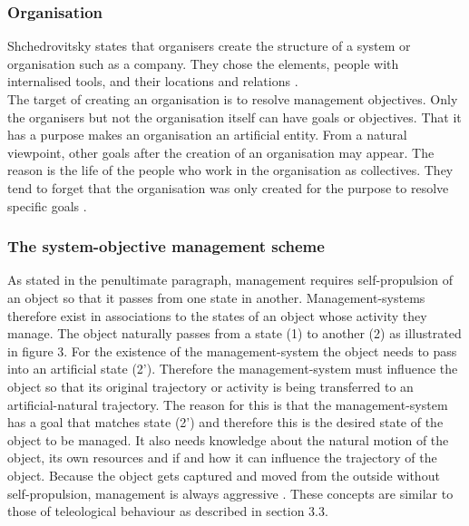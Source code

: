 \documentclass[11pt,a4paper]{article}
\begin{document}
\subsubsection{Organisation}
Shchedrovitsky states that organisers create the structure of a system or organisation such as a company. They chose the elements, people with internalised tools, and their locations and relations \cite[p. 51ff.]{MSM}.\\
The target of creating an organisation is to resolve management objectives. Only the organisers but not the organisation itself can have goals or objectives. That it has a purpose makes an organisation an artificial entity. From a natural viewpoint, other goals after the creation of an organisation may appear. The reason is the life of the people who work in the organisation as collectives. They tend to forget that the organisation was only created for the purpose to resolve specific goals \cite[p. 53f.]{MSM}. 

\subsubsection{The system-objective management scheme}
As stated in the penultimate paragraph, management requires self-propulsion of an object so that it passes from one state in another. Management-systems therefore exist in associations to the states of an object whose activity they manage. The object naturally passes from a state (1) to another (2) as illustrated in figure 3. For the existence of the management-system the object needs to pass into an artificial state (2’). Therefore the management-system must influence the object so that its original trajectory or activity is being transferred to an artificial-natural trajectory. The reason for this is that the management-system has a goal that matches state (2’) and therefore this is the desired state of the object to be managed. It also needs knowledge about the natural motion of the object, its own resources and if and how it can influence the trajectory of the object. Because the object gets captured and moved from the outside without self-propulsion, management is always aggressive \linebreak \cite[p. 54ff.]{MSM}. These concepts are similar to those of teleological behaviour as described in section 3.3.
\end{document}
